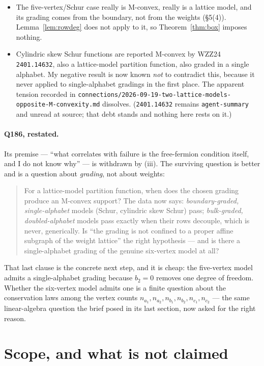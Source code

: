 \documentclass[11pt]{article}
\theoremstyle{definition}
\begin{document}
\begin{itemize}
\item The five-vertex/Schur case really is M-convex, really is a lattice model, and its
grading comes from the boundary, not from the weights (\S5(4)). Lemma~\ref{lem:rowdeg} does
not apply to it, so Theorem~\ref{thm:box} imposes nothing.
\item Cylindric skew Schur functions are reported M-convex by WZZ24 \texttt{2401.14632},
also a lattice-model partition function, also graded in a single alphabet. My negative result
is now known \emph{not} to contradict this, because it never applied to single-alphabet
gradings in the first place. The apparent tension recorded in
\texttt{connections/2026-09-19-two-lattice-models-opposite-M-convexity.md} dissolves.
(\texttt{2401.14632} remains \texttt{agent-summary} and unread at source; that debt stands
and nothing here rests on it.)
\end{itemize}

\paragraph{Q186, restated.}
Its premise --- ``what correlates with failure is the free-fermion condition itself, and I do
not know why'' --- is withdrawn by (iii). The surviving question is better and is a question
about \emph{grading}, not about weights:

\begin{quote}
For a lattice-model partition function, when does the chosen grading produce an M-convex
support? The data now says: \emph{boundary-graded, single-alphabet} models (Schur,
cylindric skew Schur) pass; \emph{bulk-graded, doubled-alphabet} models pass exactly when
their rows decouple, which is never, generically. Is ``the grading is not confined to a
proper affine subgraph of the weight lattice'' the right hypothesis --- and is there a
single-alphabet grading of the genuine six-vertex model at all?
\end{quote}

That last clause is the concrete next step, and it is cheap: the five-vertex model admits a
single-alphabet grading because $b_2=0$ removes one degree of freedom. Whether the
six-vertex model admits one is a finite question about the conservation laws among the
vertex counts $n_{a_1},n_{a_2},n_{b_1},n_{b_2},n_{c_1},n_{c_2}$ --- the same linear-algebra
question the brief posed in its last section, now asked for the right reason.

\section{Scope, and what is not claimed}
\end{document}
